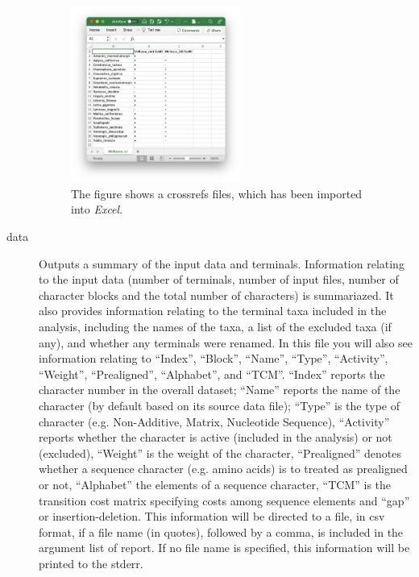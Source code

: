 \begin{description}
		\begin{figure}
		\centering
		\includegraphics[width=0.55\textwidth]{crossrefs1.png}
		\caption{The figure shows a crossrefs files, which has been imported into 
		\textit{Excel}.}
		\label{crossrefs}
		\end{figure}
			
		\item[data] Outputs a summary of the input data and terminals. Information relating 
		to the input data (number of terminals, number of input files, number of character 
		blocks and the total number of characters) is summariazed. It also provides
		information relating to the terminal taxa included in the analysis, including the 
		names of the taxa, a list of the excluded taxa (if any), and whether any terminals 
		were renamed. In this file you will also see information relating to ``Index'', ``Block'', 
		``Name'', ``Type'', ``Activity'', ``Weight'', ``Prealigned'', ``Alphabet'', and ``TCM''. 
		``Index'' reports the character number in the overall dataset; ``Name'' reports the 
		name of the character (by default based on its source data file); ``Type'' is the type 
		of character (e.g. Non-Additive, Matrix, Nucleotide Sequence), ``Activity'' reports 
		whether the character is active (included in the analysis) or not (excluded), 
		``Weight'' is the weight of the character, ``Prealigned''  denotes whether a 
		sequence character (e.g. amino acids) is to treated as prealigned or not, 
		``Alphabet'' the elements of a sequence character, ``TCM'' is the transition cost 
		matrix specifying costs among sequence elements and ``gap'' or insertion-deletion.
		This information will be directed to a file, in csv format, if a file name (in quotes), 
		followed by a comma, is included in the argument list of report. If no file name is 
		specified, this information will be printed to the stderr.
	

\end{description}
